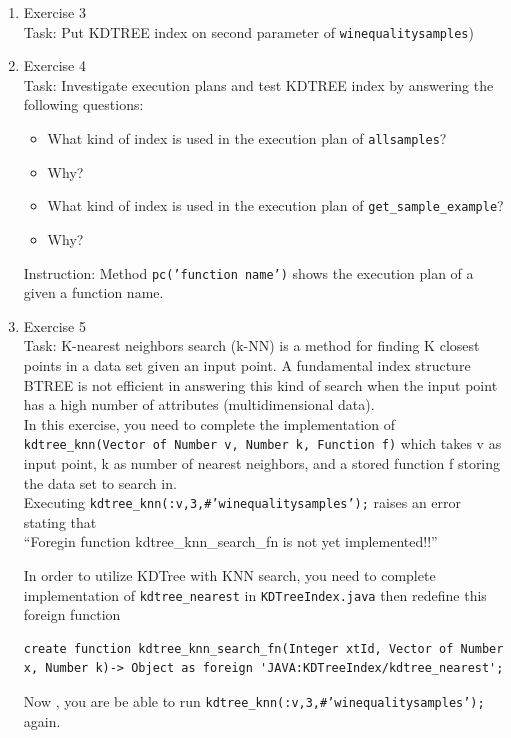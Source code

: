 \documentclass[12pt]{article}
\begin{document}
\begin{enumerate}
Since KDTRree does not support explicitly an approach to scan through all index keys (FULL INDEX SCAN). Therefore, you do not need to implement kdtree\_mapper and do not drop a primary index HASH created by default.
\item  Exercise 3\\
Task: Put KDTREE index on second parameter of \texttt{winequalitysamples}) 
\item  Exercise 4\\
Task: Investigate execution plans and test KDTREE index by answering the following questions:
\begin{itemize}
\item What kind of index is used in the execution plan of \texttt{allsamples}?
\item Why?
\item What kind of index is used in the execution plan of \texttt{get\_sample\_example}?
\item Why?
\end{itemize}
Instruction: Method \texttt{pc('function name')} shows the execution plan of a given a function name.
\item  Exercise 5\\
Task: K-nearest neighbors search (k-NN) is a method for finding K closest points in a data set given an input point. A fundamental index structure BTREE is not efficient in answering this kind of search when the input point has a high number of attributes (multidimensional data). \\
In this exercise, you need to complete the implementation of \texttt{kdtree\_knn(Vector of Number v, Number k, Function f)} which takes v as input point, k as number of nearest neighbors, and a stored function f storing the data set to search in.\\
Executing \texttt{kdtree\_knn(:v,3,\#'winequalitysamples');} raises an error stating that\\
``Foregin function kdtree\_knn\_search\_fn is not yet implemented!!''

In order to utilize KDTree with KNN search, you need to complete implementation of \texttt{kdtree\_nearest} in \texttt{KDTreeIndex.java} then redefine this foreign function
\begin{lstlisting}[caption={Foreign function kdtree\_knn\_search\_fn},label={lst:defamosqlknn}]
   create function kdtree_knn_search_fn(Integer xtId, Vector of Number x, Number k)-> Object as foreign 'JAVA:KDTreeIndex/kdtree_nearest';
\end{lstlisting}
Now , you are be able to run \texttt{kdtree\_knn(:v,3,\#'winequalitysamples');} again.
\end{enumerate}
\end{document}
